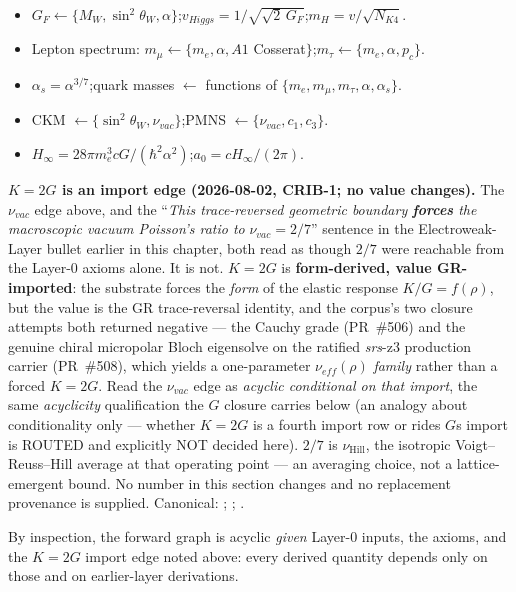 \begin{itemize}
    \item $G_F \leftarrow \{M_W, \sin^2\theta_W, \alpha\}$;\quad $v_{Higgs} = 1/\sqrt{\sqrt{2}\,G_F}$;\quad $m_H = v/\sqrt{N_{K4}}$.
    \item Lepton spectrum: $m_\mu \leftarrow \{m_e, \alpha, A1$ Cosserat$\}$;\quad $m_\tau \leftarrow \{m_e, \alpha, p_c\}$.
    \item $\alpha_s = \alpha^{3/7}$;\quad quark masses $\leftarrow$ functions of $\{m_e, m_\mu, m_\tau, \alpha, \alpha_s\}$.
    \item CKM $\leftarrow \{\sin^2\theta_W, \nu_{vac}\}$;\quad PMNS $\leftarrow \{\nu_{vac}, c_1, c_3\}$.
    \item $H_\infty = 28\pi m_e^3 c G/(\hbar^2 \alpha^2)$;\quad $a_0 = c H_\infty / (2\pi)$.
\end{itemize}

\noindent\textbf{$K = 2G$ is an import edge (2026-08-02, CRIB-1; no value changes).} The $\nu_{vac}$ edge above, and the ``\emph{This trace-reversed geometric boundary \textbf{forces} the macroscopic vacuum Poisson's ratio to} $\nu_{vac} = 2/7$'' sentence in the Electroweak-Layer bullet earlier in this chapter, both read as though $2/7$ were reachable from the Layer-0 axioms alone. It is not. $K = 2G$ is \textbf{form-derived, value GR-imported}: the substrate forces the \emph{form} of the elastic response $K/G = f(\rho)$, but the value is the GR trace-reversal identity, and the corpus's two closure attempts both returned negative --- the Cauchy grade (PR~\#506) and the genuine chiral micropolar Bloch eigensolve on the ratified \emph{srs}-z3 production carrier (PR~\#508), which yields a one-parameter $\nu_{eff}(\rho)$ \emph{family} rather than a forced $K = 2G$. Read the $\nu_{vac}$ edge as \emph{acyclic conditional on that import}, the same \emph{acyclicity} qualification the $G$ closure carries below (an analogy about conditionality only --- whether $K=2G$ is a fourth import row or rides $G$\textquotesingle s import is ROUTED and explicitly NOT decided here). $2/7$ is $\nu_{\text{Hill}}$, the isotropic Voigt--Reuss--Hill average at that operating point --- an averaging choice, not a lattice-emergent bound. No number in this section changes and no replacement provenance is supplied. Canonical: ; ; .

By inspection, the forward graph is acyclic \emph{given} Layer-0 inputs, the axioms, and the $K = 2G$ import edge noted above: every derived quantity depends only on those and on earlier-layer derivations.

